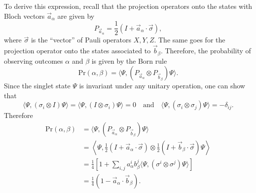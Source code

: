 \documentclass[a4paper]{article}
\begin{document}
    {\color{blue}
    To derive this expression, recall that the projection
    operators onto the states with Bloch vectors $\vec
    a_\alpha$ are given by
    \begin{equation}
        P_{\vec a_\alpha}
        = \frac{1}{2} \left( I + \vec a_\alpha \cdot \vec
        \sigma \right), 
    \end{equation}
    where $\vec \sigma$ is the ``vector'' of Pauli operators
    $X,Y,Z$. The same goes for the projection operator onto
    the states associated to $\vec b_{\beta}$. Therefore,
    the probability of observing outcomes $\alpha$ and
    $\beta$ is given by the Born rule
    \begin{equation}
        \text{Pr}(\alpha,\beta)
        = \langle \Psi, (P_{\vec a_\alpha} \otimes P_{\vec
        b_\beta}) \Psi \rangle.
    \end{equation}
    Since the singlet state $\Psi$ is invariant under any
    unitary operation, one can show that 
    \begin{equation}
        \langle \Psi, (\sigma_i \otimes I) \Psi \rangle
        = \langle \Psi, (I \otimes \sigma_i) \Psi \rangle
        = 0
        \quad\text{and}\quad
        \langle \Psi, (\sigma_i \otimes \sigma_j) \Psi
        \rangle
        = -\delta_{ij}.
    \end{equation}
    Therefore
    \begin{align}
        \text{Pr}(\alpha,\beta)
        &= \langle \Psi, (P_{\vec a_\alpha} \otimes P_{\vec
        b_\beta}) \Psi \rangle \\
        &= \left\langle \Psi, \frac{1}{2} \left( I +
        \vec a_\alpha \cdot \vec \sigma \right) 
        \otimes \frac{1}{2} \left( I + \vec b_\beta \cdot
        \vec \sigma \right) 
        \Psi \right\rangle \\
        &= \frac{1}{4} \left[
            1 + \sum_{i,j}^{} a_\alpha^i b_\beta^j 
            \langle \Psi, (\sigma^i \otimes \sigma^j) \Psi
            \rangle
        \right] \\
        &= \frac{1}{4} \left( 1 - \vec a_\alpha \cdot \vec
        b_\beta \right). 
    \end{align}
    }
\end{document}

